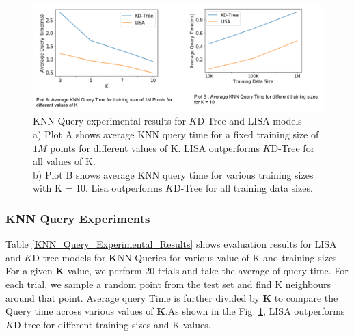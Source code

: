 \begin{figure}
    \centering
    \includegraphics[width=1\textwidth]{graphs/evaluation/one-d/KNN Query.pdf}
    \caption{KNN Query experimental results for $K$D-Tree and LISA models\\
    a) Plot A shows average KNN query time for a fixed training size of $1M$ points for different values of K. LISA outperforms $K$D-Tree for all values of K. \\
     b) Plot B shows average KNN query time for various training sizes with K = 10. Lisa outperforms $K$D-Tree for all training data sizes. }
    \label{fig:KNN_Query_Comparision}
\end{figure}

\subsubsection {$\boldsymbol{K}$NN Query Experiments}
Table \ref{KNN_Query_Experimental_Results} shows evaluation results for LISA and $K$D-tree models for $\boldsymbol{K}$NN Queries for various value of K and training sizes. For a given $\boldsymbol{K}$ value, we perform 20 trials and take the average of query time. For each trial, we sample a random point from the test set and find K neighbours around that point. Average query Time is further divided by $\boldsymbol{K}$ to compare the Query time across various values of $\boldsymbol{K}$.As shown in the Fig. \ref{fig:KNN_Query_Comparision}, LISA outperforms $K$D-tree for different training sizes and K values.

